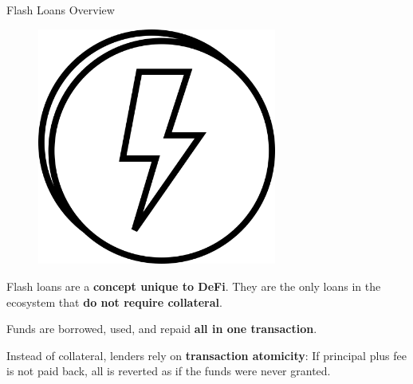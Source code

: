 \documentclass[]{beamer}
\begin{document}
\begin{frame}{Flash Loans Overview}

\begin{minipage}{0.3\textwidth}
	\begin{figure}
		\includegraphics[width=0.7\textwidth]{../assets/images/flashloan}	
	\end{figure}
\end{minipage}
\begin{minipage}{0.65\textwidth}
	Flash loans are a \textbf{concept unique to DeFi}. They are the only loans in the ecosystem that \textbf{do not require collateral}.
\end{minipage}

\vspace{2em}

 {
\begin{minipage}{0.6\textwidth}

	Funds are borrowed, used, and repaid \textbf{all in one transaction}.

	\vspace{1em}
	Instead of collateral, lenders rely on \textbf{transaction atomicity}: If principal plus fee is not paid back, all is reverted as if the funds were never granted.
\end{minipage}
\begin{minipage}{0.38\textwidth}
	\begin{figure}
		\begin{tikzpicture}[scale=0.8, every node/.style={scale=0.8}]
			
		\end{tikzpicture}	
	\end{figure}
\end{minipage}
}

\end{frame}
\end{document}
